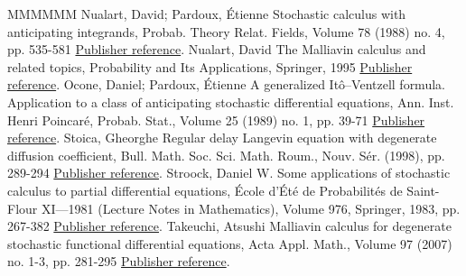 \documentclass[11pt]{article}
\theoremstyle{definition}
\numberwithin{equation}{section}
\numberwithin{figure}{section}
\numberwithin{table}{section}
\begin{document}
\begin{thebibliography}{MMMMMM}
 Nualart, David; Pardoux, Étienne Stochastic calculus with anticipating integrands, Probab. Theory Relat. Fields, Volume 78 (1988) no. 4, pp. 535-581 \href{https://ahl.centre-mersenne.org/item/AHL_2020__3__1023_0/#nualart1988stochastic}{Publisher reference}.
 Nualart, David The Malliavin calculus and related topics, Probability and Its Applications, Springer, 1995 \href{https://ahl.centre-mersenne.org/item/AHL_2020__3__1023_0/#Nualart2006}{Publisher reference}.
 Ocone, Daniel; Pardoux, Étienne A generalized Itô–Ventzell formula. Application to a class of anticipating stochastic differential equations, Ann. Inst. Henri Poincaré, Probab. Stat., Volume 25 (1989) no. 1, pp. 39-71 \href{https://ahl.centre-mersenne.org/item/AHL_2020__3__1023_0/#ocone1989generalized}{Publisher reference}.
 Stoica, Gheorghe Regular delay Langevin equation with degenerate diffusion coefficient, Bull. Math. Soc. Sci. Math. Roum., Nouv. Sér. (1998), pp. 289-294 \href{https://ahl.centre-mersenne.org/item/AHL_2020__3__1023_0/#stoica1998}{Publisher reference}.
 Stroock, Daniel W. Some applications of stochastic calculus to partial differential equations, École d’Été de Probabilités de Saint-Flour XI—1981 (Lecture Notes in Mathematics), Volume 976, Springer, 1983, pp. 267-382 \href{https://ahl.centre-mersenne.org/item/AHL_2020__3__1023_0/#ST83}{Publisher reference}.
 Takeuchi, Atsushi Malliavin calculus for degenerate stochastic functional differential equations, Acta Appl. Math., Volume 97 (2007) no. 1-3, pp. 281-295 \href{https://ahl.centre-mersenne.org/item/AHL_2020__3__1023_0/#takeuchi2007a}{Publisher reference}.
\end{thebibliography}
\end{document}

